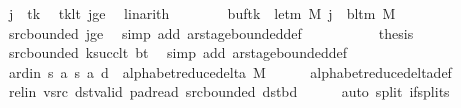 \begin{isabellebody}
\ {\isachardoublequoteopen}j\ {\isasymnoteq}\ tk{\isachardoublequoteclose}\ \isamarkupfalse%
\ tk{\isacharunderscore}{\kern0pt}lt\ jge\ \isamarkupfalse%
\ linarith\isanewline
\ \ \ \ \ \ \isamarkupfalse%
\ {\isachardoublequoteopen}{\isacharparenleft}{\kern0pt}buf{\isacharparenleft}{\kern0pt}tk\ {\isacharcolon}{\kern0pt}{\isacharequal}{\kern0pt}\ le{\isacharunderscore}{\kern0pt}tm\ M{\isacharparenright}{\kern0pt}{\isacharparenright}{\kern0pt}\ j\ {\isacharequal}{\kern0pt}\ bl{\isacharunderscore}{\kern0pt}tm\ M{\isachardoublequoteclose}\isanewline
\ \ \ \ \ \ \ \ \isamarkupfalse%
\ src{\isacharunderscore}{\kern0pt}bounded\ jge\ \isamarkupfalse%
\ {\isacharparenleft}{\kern0pt}simp\ add{\isacharcolon}{\kern0pt}\ ar{\isacharunderscore}{\kern0pt}stage{\isacharunderscore}{\kern0pt}bounded{\isacharunderscore}{\kern0pt}def{\isacharparenright}{\kern0pt}\isanewline
\ \ \ \ \isamarkupfalse%
\isanewline
\ \ \ \ \isamarkupfalse%
\ {\isacharquery}{\kern0pt}thesis\ \isamarkupfalse%
\ src{\isacharunderscore}{\kern0pt}bounded\ ksucc{\isacharunderscore}{\kern0pt}lt\ bt\ \isamarkupfalse%
\ {\isacharparenleft}{\kern0pt}simp\ add{\isacharcolon}{\kern0pt}\ ar{\isacharunderscore}{\kern0pt}stage{\isacharunderscore}{\kern0pt}bounded{\isacharunderscore}{\kern0pt}def{\isacharparenright}{\kern0pt}\isanewline
\ \ \isamarkupfalse%
\isanewline
\ \ \isamarkupfalse%
\ ard{\isacharunderscore}{\kern0pt}in{\isacharcolon}{\kern0pt}\ {\isachardoublequoteopen}{\isacharparenleft}{\kern0pt}{\isacharquery}{\kern0pt}s{\isacharcomma}{\kern0pt}\ {\isacharquery}{\kern0pt}a{\isacharcomma}{\kern0pt}\ {\isacharquery}{\kern0pt}s{\isacharprime}{\kern0pt}{\isacharcomma}{\kern0pt}\ {\isacharquery}{\kern0pt}a{\isacharcomma}{\kern0pt}\ {\isacharquery}{\kern0pt}d{\isacharparenright}{\kern0pt}\ {\isasymin}\ alphabet{\isacharunderscore}{\kern0pt}reduce{\isacharunderscore}{\kern0pt}delta\ M{\isachardoublequoteclose}\isanewline
\ \ \ \ \isamarkupfalse%
\ alphabet{\isacharunderscore}{\kern0pt}reduce{\isacharunderscore}{\kern0pt}delta{\isacharunderscore}{\kern0pt}def\isanewline
\ \ \ \ \isamarkupfalse%
\ rel{\isacharunderscore}{\kern0pt}in\ vsrc\ dst{\isacharunderscore}{\kern0pt}valid\ pad{\isacharunderscore}{\kern0pt}read\ src{\isacharunderscore}{\kern0pt}bounded\ dst{\isacharunderscore}{\kern0pt}bd\isanewline
\ \ \ \ \isamarkupfalse%
\ {\isacharparenleft}{\kern0pt}auto\ split{\isacharcolon}{\kern0pt}\ if{\isacharunderscore}{\kern0pt}splits{\isacharparenright}{\kern0pt}\isanewline

\end{isabellebody}

